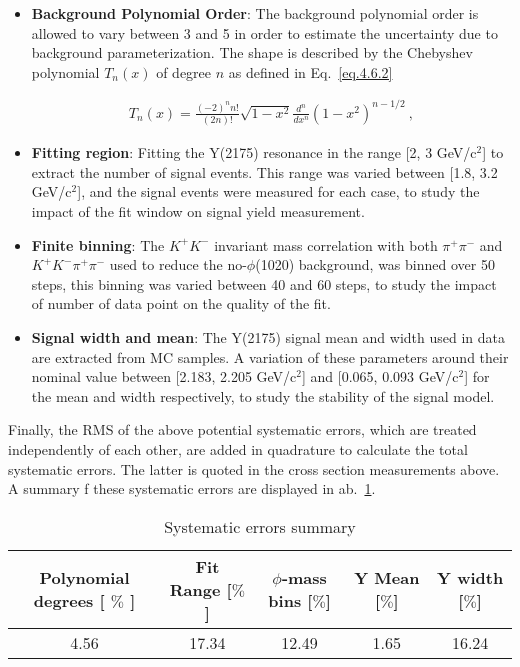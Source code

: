 \begin{itemize}
    \item \textbf{Background Polynomial Order}: The background polynomial order is allowed to vary between 3 and 5 in order to estimate the uncertainty due to background parameterization. The shape is described by the Chebyshev polynomial $T_n(x)$ of degree $n$ as defined in Eq.~\ref{eq.4.6.2}
 
    \begin{equation}
        \label{eq.4.6.2}
        \begin{aligned}
            T_n(x) = \frac{(-2)^{n}n!}{(2n)!}\sqrt{1-x^2}\frac{d^n}{dx^n}(1-x^2)^{n-1/2}~,
        \end{aligned}
    \end{equation}

    \item \textbf{Fitting region}: Fitting the Y(2175) resonance in the range [2, 3 GeV/c$^2$] to extract the number of signal events. This range was varied between [1.8, 3.2 GeV/c$^2$], and the signal events were measured for each case, to study the impact of the fit window on signal yield measurement.
    \item \textbf{Finite binning}: The $K^+K^-$ invariant mass correlation with both $\pi^+\pi^-$ and $K^+K^-\pi^+\pi^-$ used to reduce the no-$\phi$(1020) background, was binned over 50 steps, this binning was varied between 40 and 60 steps, to study the impact of number of data point on the quality of the fit.
    \item \textbf{Signal width and mean}: The Y(2175) signal mean and width used in data are extracted from MC samples. A variation of these parameters around their nominal value between [2.183, 2.205 GeV/c$^2$] and [0.065, 0.093 GeV/c$^2$] for the mean and width respectively, to study the stability of the signal model.
\end{itemize}

Finally, the RMS of the above potential systematic errors, which are treated independently of each other, are added in quadrature to calculate the total systematic errors. The latter is quoted in the cross section measurements above. A summary f these systematic errors are displayed in ab.~\ref{tab.4.6}.

\begin{table}[!htbp]
    \centering
    \caption{Systematic errors summary}
    \label{tab.4.6}
    \begin{tabular}{|c|c|c|c|c|}
        \hline
        Polynomial degrees [ $\%$ ] & Fit Range [$\%$] & $\phi$-mass bins [$\%$]  & Y Mean [$\%$] & Y width [$\%$] \\
        \hline
        4.56 & 17.34 & 12.49 & 1.65 & 16.24 \\
        \hline
    \end{tabular}
\end{table}

